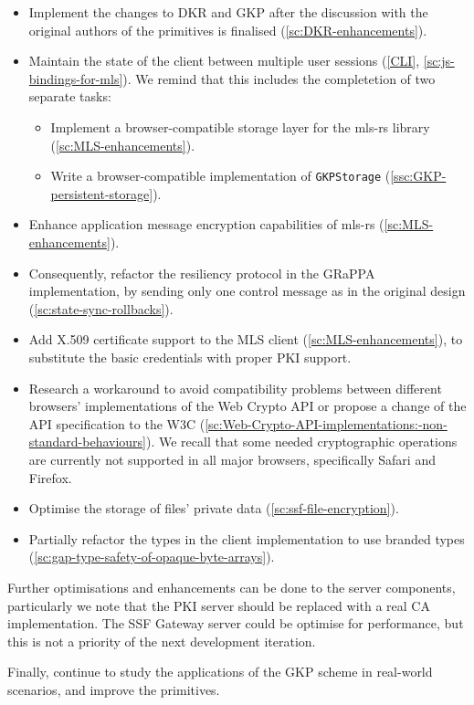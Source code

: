\begin{itemize}
    \item Implement the changes to DKR and GKP after the discussion with the original authors of the primitives is finalised (\cref{sc:DKR-enhancements}).
    \item Maintain the state of the client between multiple user sessions (\cref{CLI}, \cref{sc:js-bindings-for-mls}). We remind that this includes the completetion of two separate tasks:
    \begin{itemize}
        \item Implement a browser-compatible storage layer for the mls-rs library (\cref{sc:MLS-enhancements}).
        \item Write a browser-compatible implementation of \texttt{GKPStorage} (\cref{ssc:GKP-persistent-storage}).
    \end{itemize}
    \item Enhance application message encryption capabilities of mls-rs (\cref{sc:MLS-enhancements}).
    \item Consequently, refactor the resiliency protocol in the GRaPPA implementation, by sending only one control message as in the original design (\cref{sc:state-sync-rollbacks}).
    \item Add X.509 certificate support to the MLS client (\cref{sc:MLS-enhancements}), to substitute the basic credentials with proper PKI support.
    \item Research a workaround to avoid compatibility problems between different browsers' implementations of the Web Crypto API or propose a change of the API specification to the W3C  (\cref{sc:Web-Crypto-API-implementations:-non-standard-behaviours}). We recall that some needed cryptographic operations are currently not supported in all major browsers, specifically Safari and Firefox. 
    \item Optimise the storage of files' private data (\cref{sc:ssf-file-encryption}).
    \item Partially refactor the types in the client implementation to use branded types (\cref{sc:gap-type-safety-of-opaque-byte-arrays}).
\end{itemize}

Further optimisations and enhancements can be done
to the server components, particularly we note that
the PKI server should be replaced with a real CA
implementation. The SSF Gateway server could be optimise
for performance, but this is not a priority of the
next development iteration.

Finally, continue to study the applications of the GKP scheme in
real-world scenarios, and improve the primitives.
